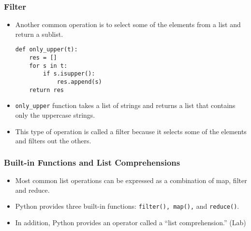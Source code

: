 \documentclass{beamer}
\newcommand{\beforeverb}{\footnotesize}
\newcommand{\afterverb}{\normalsize}
\begin{document}
\begin{frame}[fragile]
\frametitle{Filter}
\begin{itemize}
\item Another common operation is to select some of the elements from
a list and return a sublist.

\beforeverb
\begin{verbatim}
def only_upper(t):
    res = []
    for s in t:
        if s.isupper():
            res.append(s)
    return res
\end{verbatim}
\afterverb
%
\item  \verb!only_upper! function takes a list of strings and returns a list that contains
only the uppercase strings.
\item This type of  operation  is called a \alert{filter} because
it selects some of the elements and filters out the others.
\end{itemize}
\end{frame}
\begin{frame}[fragile]
\frametitle{Built-in Functions and List Comprehensions}
\begin{itemize}
\item Most common list operations can be expressed as a combination
of map, filter and reduce. 
\item  Python provides three built-in functions: \verb!filter(), map(),! and \verb!reduce()!.
\item In addition, Python provides an operator called a ``list comprehension.'' (Lab)
\end{itemize}
\end{frame}
\end{document}
